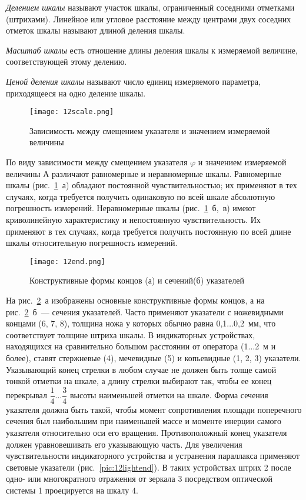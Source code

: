 \textit{Делением шкалы} называют участок шкалы, ограниченный соседними отметками (штрихами). Линейное или угловое расстояние между центрами двух соседних отметок шкалы называют длиной деления шкалы.

\textit{Масштаб шкалы} есть отношение длины деления шкалы к измеряемой величине, соответствующей этому делению.

\textit{Ценой деления шкалы} называют число единиц измеряемого параметра, приходящееся на одно деление шкалы.

\begin{figure}[h!]
	\caption{ Зависимость между смещением указателя и значением измеряемой величины }
	\texttt{[image: 12scale.png]}
	\label{pic:12scale}
\end{figure}

По виду зависимости между смещением указателя $ \varphi $ и значением измеряемой величины $ А $ различают равномерные и неравномерные шкалы. Равномерные шкалы (рис.~\ref{pic:12scale}~а) обладают постоянной чувствительностью; их применяют в тех случаях, когда требуется получить одинаковую по всей шкале абсолютную погрешность измерений. Неравномерные шкалы (рис.~\ref{pic:12scale}~б,~в) имеют криволинейную характеристику и непостоянную чувствительность. Их применяют в тех случаях, когда требуется получить постоянную по всей длине шкалы относительную погрешность измерений. 

\begin{figure}[h!]
	\caption{ Конструктивные формы концов (а) и сечений(б) указателей }
	\texttt{[image: 12end.png]}
	\label{pic:12end}
\end{figure}

На рис.~\ref{pic:12end}~а изображены основные конструктивные формы концов, а на рис.~\ref{pic:12end}~б~--- сечения указателей. Часто применяют указатели с ножевидными концами (6, 7, 8), толщина ножа у которых обычно равна 0,1$ \ldots $0,2~мм, что соответствует толщине штриха шкалы. В индикаторных устройствах, находящихся на сравнительно большом расстоянии от оператора (1$ \ldots $2~м и более), ставят стержневые (4), мечевидные (5) и копьевидные (1, 2, 3) указатели. Указывающий конец стрелки в любом случае не должен быть толще самой тонкой отметки на шкале, а длину стрелки выбирают так, чтобы ее конец перекрывал $ \dfrac{1}{4} \ldots  \dfrac{3}{4}$ высоты наименьшей отметки на шкале. Форма сечения указателя должна быть такой, чтобы момент сопротивления площади поперечного сечения был наибольшим при наименьшей массе и моменте инерции самого указателя относительно оси его вращения. Противоположный конец указателя должен уравновешивать его указывающую часть. Для увеличения чувствительности индикаторного устройства и устранения параллакса  применяют световые указатели (рис.~\ref{pic:12lightend}). В таких устройствах штрих 2 после одно- или многократного отражения от зеркала 3 посредством оптической системы 1 проецируется на шкалу 4.

